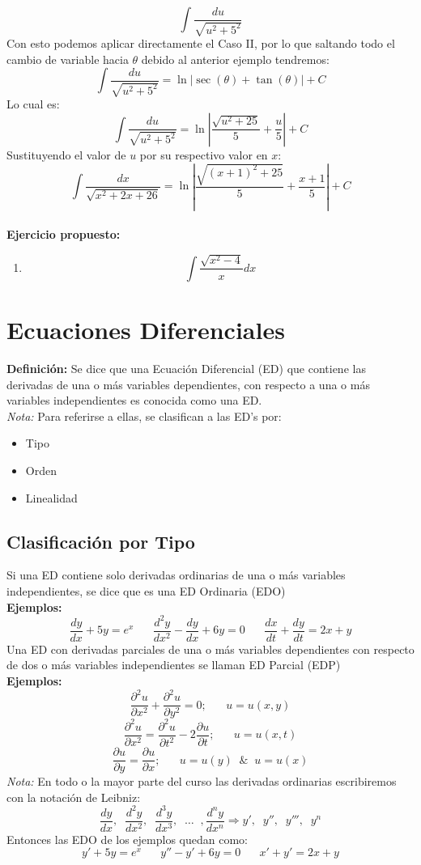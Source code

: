 \documentclass[10pt]{article}
\begin{document}
\[\int \frac{du}{\sqrt{u^{2}+5^{2}}}\]
Con esto podemos aplicar directamente el Caso II, por lo que saltando todo el cambio de variable hacia $\theta$ debido al anterior ejemplo tendremos:
\[\int \frac{du}{\sqrt{u^{2}+5^{2}}}=\ln\left|\sec(\theta)+\tan(\theta)\right|+C\]
Lo cual es:
\[\int \frac{du}{\sqrt{u^{2}+5^{2}}}=\ln\left|\frac{\sqrt{u^{2}+25}}{5}+\frac{u}{5}\right|+C\]
Sustituyendo el valor de $u$ por su respectivo valor en $x$:
\[\int\frac{dx}{\sqrt{x^{2}+2x+26}}=\ln\left|\frac{{\sqrt{(x+1)^2+25}}}{5}+\frac{x+1}{5}\right|+C\]
\\\vspace{0.5cm}
\textbf{Ejercicio propuesto:}
\begin{enumerate}
  \item \[\int\frac{\sqrt{x^{2}-4}}{x}dx\]
\end{enumerate}
\clearpage

\section{Ecuaciones Diferenciales}
\textbf{Definición:} Se dice que una Ecuación Diferencial (ED) que contiene las derivadas de una o más variables dependientes, con respecto a una o más variables independientes es conocida como una ED.\\
\textit{Nota:} Para referirse a ellas, se clasifican a las ED's por:
\begin{itemize}
  \item Tipo
  \item Orden
  \item Linealidad
\end{itemize}
\subsection{Clasificación por Tipo}
Si una ED contiene solo derivadas ordinarias de una o más variables independientes, se dice que es una ED Ordinaria (EDO)
\\\textbf{Ejemplos:}
\[\frac{dy}{dx}+5y=e^{x}\;\;\;\;\;\;\frac{d^{2}y}{dx^{2}}-\frac{dy}{dx}+6y=0 \;\;\;\;\;\;\frac{dx}{dt}+\frac{dy}{dt}=2x+y\]
Una ED con derivadas parciales de una o más variables dependientes con respecto de dos o más variables independientes se llaman ED Parcial (EDP)
\\\textbf{Ejemplos:}\\
\[\frac{\partial^{2}u}{\partial x^{2}}+\frac{\partial^{2}u}{\partial y^{2}}=0;\;\;\;\;\;\; u=u(x,y)\]
\[\frac{\partial^{2}u}{\partial x^{2}}=\frac{\partial^{2}u}{\partial t^{2}}-2\frac{\partial u}{\partial t};\;\;\;\;\;\; u=u(x,t)\]
\[\frac{\partial u}{\partial y}=\frac{\partial u}{\partial x}; \;\;\;\;\;\; u=u(y)\;\;\&\;\;u=u(x)\]
\textit{Nota:} En todo o la mayor parte del curso las derivadas ordinarias escribiremos con la notación de Leibniz:
\[\frac{dy}{dx},\;\;\frac{d^{2}y}{dx^{2}},\;\;\frac{d^{3}y}{dx^{3}},\;\;\ldots\;\;,\frac{d^{n}y}{dx^{n}} \Rightarrow y',\;\;y'',\;\;y''',\;\;y^{n}\]
Entonces las EDO de los ejemplos quedan como:
\[y'+5y=e^{x}\;\;\;\;\;\;y''-y'+6y=0\;\;\;\;\;\;x'+y'=2x+y\]
\clearpage
\end{document}

